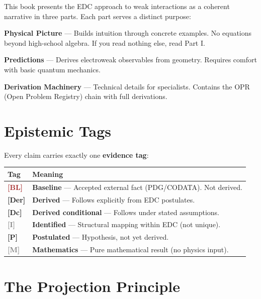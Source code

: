 \documentclass[11pt,a4paper]{book}
\theoremstyle{definition}
\theoremstyle{remark}
\newcommand{\tagBL}{\textcolor{brown}{\textbf{[BL]}}}
\newcommand{\tagDer}{\textcolor{derivedColor}{\textbf{[Der]}}}
\newcommand{\tagDc}{\textcolor{calibratedColor}{\textbf{[Dc]}}}
\newcommand{\tagI}{\textcolor{gray}{\textbf{[I]}}}
\newcommand{\tagP}{\textcolor{postulatedColor}{\textbf{[P]}}}
\newcommand{\tagM}{\textcolor{gray}{\textbf{[M]}}}
\begin{document}
This book presents the EDC approach to weak interactions as a coherent narrative
in three parts. Each part serves a distinct purpose:

\begin{description}[leftmargin=2cm,labelwidth=1.8cm]
\item[Part I] \textbf{Physical Picture} --- Builds intuition through concrete examples.
    No equations beyond high-school algebra. If you read nothing else, read Part I.
\item[Part II] \textbf{Predictions} --- Derives electroweak observables from geometry.
    Requires comfort with basic quantum mechanics.
\item[Part III] \textbf{Derivation Machinery} --- Technical details for specialists.
    Contains the OPR (Open Problem Registry) chain with full derivations.
\end{description}

\section*{Epistemic Tags}

Every claim carries exactly one \textbf{evidence tag}:

\begin{center}
\begin{tabular}{@{}lp{10cm}@{}}
\toprule
\textbf{Tag} & \textbf{Meaning} \\
\midrule
\tagBL{}  & \textbf{Baseline} --- Accepted external fact (PDG/CODATA). Not derived. \\
\tagDer{} & \textbf{Derived} --- Follows explicitly from EDC postulates. \\
\tagDc{}  & \textbf{Derived conditional} --- Follows under stated assumptions. \\
\tagI{}   & \textbf{Identified} --- Structural mapping within EDC (not unique). \\
\tagP{}   & \textbf{Postulated} --- Hypothesis, not yet derived. \\
\tagM{}   & \textbf{Mathematics} --- Pure mathematical result (no physics input). \\
\bottomrule
\end{tabular}
\end{center}

\section*{The Projection Principle}
\end{document}
